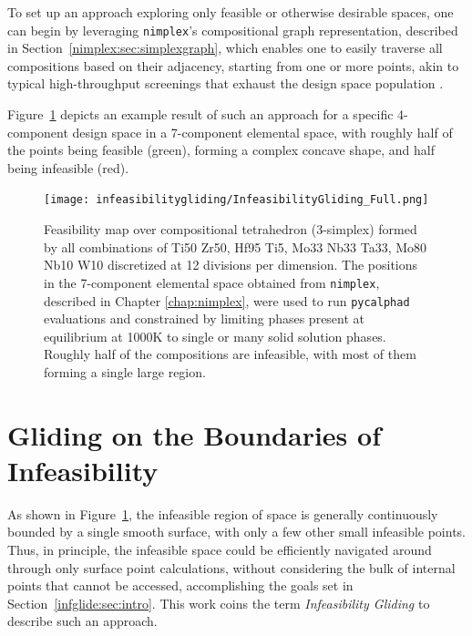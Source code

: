 To set up an approach exploring only feasible or otherwise desirable spaces, one can begin by leveraging \texttt{nimplex}'s compositional graph representation, described in Section~\ref{nimplex:sec:simplexgraph}, which enables one to easily traverse all compositions based on their adjacency, starting from one or more points, akin to typical high-throughput screenings that exhaust the design space population \cite{Feng2021High-throughputAlloys, Wang2023SearchingExperiments, Yang2022AHardness, Maresca2020Mechanistic1900K}.

Figure~\ref{infeasibilitygliding:fig:fullcomputation} depicts an example result of such an approach for a specific 4-component design space in a 7-component elemental space, with roughly half of the points being feasible (green), forming a complex concave shape, and half being infeasible (red).

\begin{figure}[H]
    \centering
    \texttt{[image: infeasibilitygliding/InfeasibilityGliding\_Full.png]}
    \caption{Feasibility map over compositional tetrahedron (3-simplex) formed by all combinations of Ti50 Zr50, Hf95 Ti5, Mo33 Nb33 Ta33, Mo80 Nb10 W10 discretized at 12 divisions per dimension. The positions in the 7-component elemental space obtained from \texttt{nimplex}, described in Chapter \ref{chap:nimplex}, were used to run \texttt{pycalphad} \cite{Otis2017Pycalphad:Python} evaluations and constrained by limiting phases present at equilibrium at 1000K to single or many solid solution phases. Roughly half of the compositions are infeasible, with most of them forming a single large region.}
    \label{infeasibilitygliding:fig:fullcomputation}
\end{figure}

\section{Gliding on the Boundaries of Infeasibility} \label{infglide:sec:glide}

As shown in Figure~\ref{infeasibilitygliding:fig:fullcomputation}, the infeasible region of space is generally continuously bounded by a single smooth surface, with only a few other small infeasible points. Thus, in principle, the infeasible space could be efficiently navigated around through only surface point calculations, without considering the bulk of internal points that cannot be accessed, accomplishing the goals set in Section~\ref{infglide:sec:intro}. This work coins the term \emph{Infeasibility Gliding} to describe such an approach.

